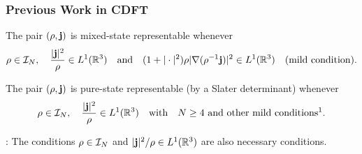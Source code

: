 \documentclass[9pt,xcolor=dvipsnames]{beamer}
\begin{document}
\begin{frame}

\frametitle{Previous Work in CDFT}


\begin{theorem}
	The pair $(\rho, {\bold j})$ is mixed-state representable whenever
	\[
		\rho \in {\mathcal I}_N, \quad \dfrac{| {\bold j} |^2}{\rho} \in L^1({\mathbb R}^3)
		\quad \text{and} \quad
		(1 + | \cdot |^2) \rho | \nabla (\rho^{-1}  {\bold j}) |^2 \in L^1({\mathbb R}^3)
		\quad \text{(mild condition).}
	\]
\end{theorem}


\begin{theorem}
	The pair $(\rho, {\bold j})$ is pure-state representable (by a Slater determinant) whenever
	\[
		\rho \in \cI_N, \quad \dfrac{| \bj |^2}{\rho} \in L^1(\R^3) 
		\quad \text{with} \quad
		 \text{$N \ge 4$ and other mild conditions\footnotemark}.
	\]
\end{theorem}

: The conditions $\rho \in {\mathcal I}_N$ and $| {\bold j} |^2 / \rho \in L^1({\mathbb R}^3)$ are also necessary conditions.

\vspace{2em}


\addtocounter{footnote}{-2}
\addtocounter{footnote}{1}
\addtocounter{footnote}{1}
\addtocounter{footnote}{-3}

\end{frame}





\end{document}
